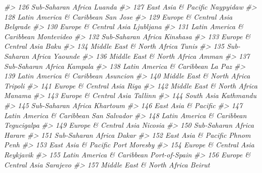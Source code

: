 \documentclass[
  xelatex, ja=standard]{bxjsbook}
\newenvironment{Shaded}{\begin{snugshade}}{\end{snugshade}}
\newcommand{\CommentTok}[1]{\textcolor[rgb]{0.56,0.35,0.01}{\textit{#1}}}
\theoremstyle{definition}
\theoremstyle{definition}
\theoremstyle{definition}
\theoremstyle{definition}
\theoremstyle{remark}
\begin{document}
\begin{Shaded}
\begin{Highlighting}[]
\CommentTok{\#\textgreater{} 126         Sub{-}Saharan Africa              Luanda}
\CommentTok{\#\textgreater{} 127        East Asia \& Pacific           Naypyidaw}
\CommentTok{\#\textgreater{} 128  Latin America \& Caribbean            San Jose}
\CommentTok{\#\textgreater{} 129      Europe \& Central Asia            Belgrade}
\CommentTok{\#\textgreater{} 130      Europe \& Central Asia           Ljubljana}
\CommentTok{\#\textgreater{} 131  Latin America \& Caribbean          Montevideo}
\CommentTok{\#\textgreater{} 132         Sub{-}Saharan Africa            Kinshasa}
\CommentTok{\#\textgreater{} 133      Europe \& Central Asia                Baku}
\CommentTok{\#\textgreater{} 134 Middle East \& North Africa               Tunis}
\CommentTok{\#\textgreater{} 135         Sub{-}Saharan Africa             Yaounde}
\CommentTok{\#\textgreater{} 136 Middle East \& North Africa               Amman}
\CommentTok{\#\textgreater{} 137         Sub{-}Saharan Africa             Kampala}
\CommentTok{\#\textgreater{} 138  Latin America \& Caribbean              La Paz}
\CommentTok{\#\textgreater{} 139  Latin America \& Caribbean            Asuncion}
\CommentTok{\#\textgreater{} 140 Middle East \& North Africa             Tripoli}
\CommentTok{\#\textgreater{} 141      Europe \& Central Asia                Riga}
\CommentTok{\#\textgreater{} 142 Middle East \& North Africa              Manama}
\CommentTok{\#\textgreater{} 143      Europe \& Central Asia             Tallinn}
\CommentTok{\#\textgreater{} 144                 South Asia           Kathmandu}
\CommentTok{\#\textgreater{} 145         Sub{-}Saharan Africa            Khartoum}
\CommentTok{\#\textgreater{} 146        East Asia \& Pacific                    }
\CommentTok{\#\textgreater{} 147  Latin America \& Caribbean        San Salvador}
\CommentTok{\#\textgreater{} 148  Latin America \& Caribbean         Tegucigalpa}
\CommentTok{\#\textgreater{} 149      Europe \& Central Asia             Nicosia}
\CommentTok{\#\textgreater{} 150         Sub{-}Saharan Africa              Harare}
\CommentTok{\#\textgreater{} 151         Sub{-}Saharan Africa               Dakar}
\CommentTok{\#\textgreater{} 152        East Asia \& Pacific          Phnom Penh}
\CommentTok{\#\textgreater{} 153        East Asia \& Pacific        Port Moresby}
\CommentTok{\#\textgreater{} 154      Europe \& Central Asia           Reykjavik}
\CommentTok{\#\textgreater{} 155  Latin America \& Caribbean       Port{-}of{-}Spain}
\CommentTok{\#\textgreater{} 156      Europe \& Central Asia            Sarajevo}
\CommentTok{\#\textgreater{} 157 Middle East \& North Africa              Beirut}

\end{Highlighting}
\end{Shaded}
\end{document}
